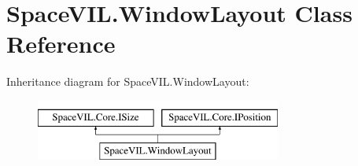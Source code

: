 \hypertarget{class_space_v_i_l_1_1_window_layout}{}\section{Space\+V\+I\+L.\+Window\+Layout Class Reference}
\label{class_space_v_i_l_1_1_window_layout}
Inheritance diagram for Space\+V\+I\+L.\+Window\+Layout\+:\begin{figure}[H]
\begin{center}
\leavevmode
\includegraphics[height=2.000000cm]{class_space_v_i_l_1_1_window_layout}
\end{center}
\end{figure}
